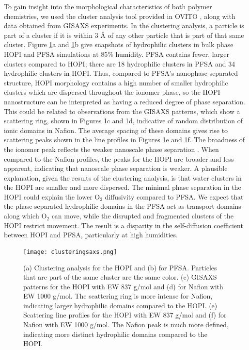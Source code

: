 \documentclass[journal=jacsat,manuscript=article]{achemso}
\begin{document}
To gain insight into the morphological characteristics of both polymer chemistries, we used the cluster analysis tool provided in OVITO \cite{stukowski_visualization_2009}, along with data obtained from GISAXS experiments. In the clustering analysis, a particle is part of a cluster if it is within 3 {\AA} of any other particle that is part of that same cluster. Figure \ref{fig:clustering}a and \ref{fig:clustering}b give snapshots of hydrophilic clusters in bulk phase HOPI and PFSA simulations at 85\% humidity. PFSA contains fewer, larger clusters compared to HOPI; there are 18 hydrophilic clusters in PFSA and 34 hydrophilic clusters in HOPI. Thus, compared to PFSA's nanophase-separated structure, HOPI morphology contains a high number of smaller hydrophilic clusters which are dispersed throughout the ionomer phase, so the HOPI nanostructure can be interpreted as having a reduced degree of phase separation. This could be related to observations from the GISAXS patterns, which show a scattering ring, shown in Figures \ref{fig:clustering}c and \ref{fig:clustering}d,  indicative of random distribution of ionic domains in Nafion. The average spacing of these domains gives rise to scattering peaks shown in the line profiles in Figures \ref{fig:clustering}e and \ref{fig:clustering}f. The broadness of the ionomer peak reflects the weaker nanoscale phase separation \cite{kusoglu_role_2012,kusoglu_nanostructureswelling_2016,su_chemical_2019}. When compared to the Nafion profiles, the peaks for the HOPI are broader and less apparent, indicating that nanoscale phase separation is weaker. A plausible explanation, given the results of the clustering analysis, is that water clusters in the HOPI are smaller and more dispersed. The minimal phase separation in the HOPI could explain the lower O$_2$ diffusivity compared to PFSA. We expect that the phase-separated hydrophilic domains in the PFSA act as transport domains along which O$_2$ can move, while the disrupted and fragmented clusters of the HOPI restrict movement. The result is a disparity in the self-diffusion coefficient between HOPI and PFSA, particularly at high humidities. 
\begin{figure}[h!]
  \texttt{[image: clusteringsaxs.png]}
  \centering
  \caption{(a) Clustering analysis for the HOPI and (b) for PFSA. Particles that are part of the same cluster are the same color. (c) GISAXS patterns for the HOPI with EW 837 g/mol and (d) for Nafion with EW 1000 g/mol. The scattering ring is more intense for Nafion, indicating larger hydrophilic domains compared to the HOPI. (e)  Scattering line profiles for the HOPI with EW 837 g/mol and (f) for Nafion with EW 1000 g/mol. The Nafion peak is much more defined, indicating more distinct hydrophilic domains compared to the HOPI.}
  \label{fig:clustering}
\end{figure}
\end{document}
